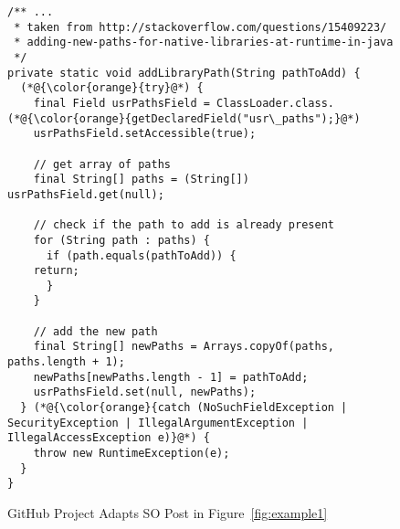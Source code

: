 \begin{figure}[t]%
	\centering
\begin{lstlisting}[]
/** ...
 * taken from http://stackoverflow.com/questions/15409223/
 * adding-new-paths-for-native-libraries-at-runtime-in-java
 */
private static void addLibraryPath(String pathToAdd) {
  (*@{\color{orange}{try}@*) {
    final Field usrPathsField = ClassLoader.class.(*@{\color{orange}{getDeclaredField("usr\_paths");}@*)
    usrPathsField.setAccessible(true);

    // get array of paths
    final String[] paths = (String[]) usrPathsField.get(null);

    // check if the path to add is already present
    for (String path : paths) {
      if (path.equals(pathToAdd)) {
	return;
      }
    }

    // add the new path
    final String[] newPaths = Arrays.copyOf(paths, paths.length + 1);
    newPaths[newPaths.length - 1] = pathToAdd;
    usrPathsField.set(null, newPaths);
  } (*@{\color{orange}{catch (NoSuchFieldException | SecurityException | IllegalArgumentException |    IllegalAccessException e)}@*) {
	throw new RuntimeException(e);
  }
}
\end{lstlisting}
        \vspace{-16pt}
        \caption{GitHub Project  Adapts SO Post in Figure~\ref{fig:example1}}
        \label{fig:example2}
\end{figure}
